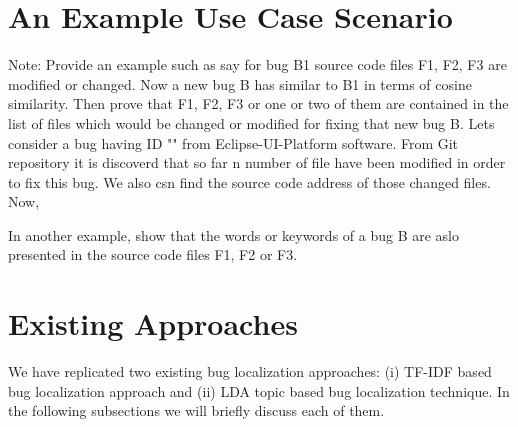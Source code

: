 \documentclass{sig-alternate}
\begin{document}


\section{An Example Use Case Scenario}\label{sec:usecase}
Note:
Provide an example such as say for bug B1 source code files F1, F2, F3 are modified or changed. Now a new bug B has similar to B1 in terms of cosine similarity. Then prove that F1, F2, F3 or one or two of them are contained in the list of files which would be changed or modified for fixing that new bug B.
Lets consider a bug having ID "" from Eclipse-UI-Platform software. From Git repository it is discoverd that so far n number of file have been modified in order to fix this bug. We also csn find the source code address of those changed files. Now, 

In another example, show that the words or keywords of a bug B are aslo presented in the source code files F1, F2 or F3. 
\section{Existing Approaches}\label{sec:existing}
We have replicated two existing bug localization approaches: (i) TF-IDF based bug localization approach and (ii) LDA topic based bug localization technique. In the following subsections we will briefly discuss each of them.
\end{document}
